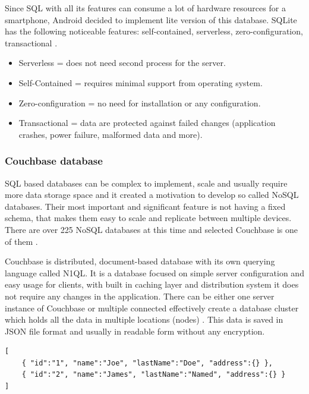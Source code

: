 Since SQL with all its features can consume a lot of hardware resources for a smartphone, Android decided to implement lite version of this database. SQLite has the following noticeable features: self-contained, serverless, zero-configuration, transactional \cite{WISQLITE}.

\begin{itemize}
	\item Serverless = does not need second process for the server.
	\item Self-Contained = requires minimal support from operating system.
	\item Zero-configuration = no need for installation or any configuration.
	\item Transactional = data are protected against failed changes (application crashes, power failure, malformed data and more).
\end{itemize}

\subsubsection{Couchbase database}\label{subsec:CouchbaseDatabase}
SQL based databases can be complex to implement, scale and usually require more data storage space and it created a motivation to develop so called NoSQL databases. Their most important and significant feature is not having a fixed schema, that makes them easy to scale and replicate between multiple devices. There are over 225 NoSQL databases at this time and selected Couchbase is one of them \cite{NOSQLDB}.

Couchbase is distributed, document-based database with its own querying language called N1QL. It is a database focused on simple server configuration and easy usage for clients, with built in caching layer and distribution system it does not require any changes in the application. There can be either one server instance of Couchbase or multiple connected effectively create a database cluster which holds all the data in multiple locations (nodes) \cite{GSWCBS}. This data is saved in JSON file format and usually in readable form without any encryption.

\begin{lstlisting}[caption=JSON format example]
[
	{ "id":"1", "name":"Joe", "lastName":"Doe", "address":{} },
	{ "id":"2", "name":"James", "lastName":"Named", "address":{} }
]
\end{lstlisting}


